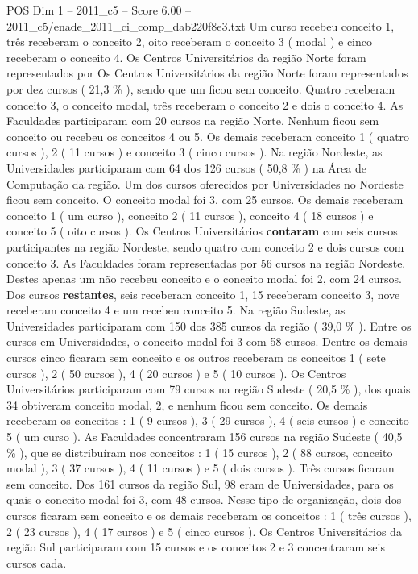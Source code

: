 \begin{textsample}{POS Dim 1 – 2011\_c5 – Score 6.00 – 2011\_c5/enade\_2011\_ci\_comp\_dab220f8e3.txt}
Um curso recebeu conceito 1, três receberam o conceito 2, oito receberam o conceito 3 ( modal ) e cinco receberam o conceito 4.
Os Centros Universitários da região Norte foram representados por Os Centros Universitários da região Norte foram representados por dez cursos ( 21,3 \% ), sendo que um ficou sem conceito.
Quatro receberam conceito 3, o conceito modal, três receberam o conceito 2 e dois o conceito 4.
As Faculdades participaram com 20 cursos na região Norte.
Nenhum ficou sem conceito ou recebeu os conceitos 4 ou 5.
Os demais receberam conceito 1 ( quatro cursos ), 2 ( 11 cursos ) e conceito 3 ( cinco cursos ).
Na região Nordeste, as Universidades participaram com 64 dos 126 cursos ( 50,8 \% ) na Área de Computação da região.
Um dos cursos oferecidos por Universidades no Nordeste ficou sem conceito.
O conceito modal foi 3, com 25 cursos.
Os demais receberam conceito 1 ( um curso ), conceito 2 ( 11 cursos ), conceito 4 ( 18 cursos ) e conceito 5 ( oito cursos ).
Os Centros Universitários \textbf{contaram} com seis cursos participantes na região Nordeste, sendo quatro com conceito 2 e dois cursos com conceito 3.
As Faculdades foram representadas por 56 cursos na região Nordeste.
Destes apenas um não recebeu conceito e o conceito modal foi 2, com 24 cursos.
Dos cursos \textbf{restantes}, seis receberam conceito 1, 15 receberam conceito 3, nove receberam conceito 4 e um recebeu conceito 5.
Na região Sudeste, as Universidades participaram com 150 dos 385 cursos da região ( 39,0 \% ).
Entre os cursos em Universidades, o conceito modal foi 3 com 58 cursos.
Dentre os demais cursos cinco ficaram sem conceito e os outros receberam os conceitos 1 ( sete cursos ), 2 ( 50 cursos ), 4 ( 20 cursos ) e 5 ( 10 cursos ).
Os Centros Universitários participaram com 79 cursos na região Sudeste ( 20,5 \% ), dos quais 34 obtiveram conceito modal, 2, e nenhum ficou sem conceito.
Os demais receberam os conceitos : 1 ( 9 cursos ), 3 ( 29 cursos ), 4 ( seis cursos ) e conceito 5 ( um curso ).
As Faculdades concentraram 156 cursos na região Sudeste ( 40,5 \% ), que se distribuíram nos conceitos : 1 ( 15 cursos ), 2 ( 88 cursos, conceito modal ), 3 ( 37 cursos ), 4 ( 11 cursos ) e 5 ( dois cursos ).
Três cursos ficaram sem conceito.
Dos 161 cursos da região Sul, 98 eram de Universidades, para os quais o conceito modal foi 3, com 48 cursos.
Nesse tipo de organização, dois dos cursos ficaram sem conceito e os demais receberam os conceitos : 1 ( três cursos ), 2 ( 23 cursos ), 4 ( 17 cursos ) e 5 ( cinco cursos ).
Os Centros Universitários da região Sul participaram com 15 cursos e os conceitos 2 e 3 concentraram seis cursos cada.

\end{textsample}
